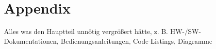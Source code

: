 \chapter{Appendix}
\label{sec:appendix}

Alles was den Hauptteil unnötig vergrößert hätte, z. B. HW-/SW-Dokumentationen, Bedienungsanleitungen, Code-Listings, Diagramme
